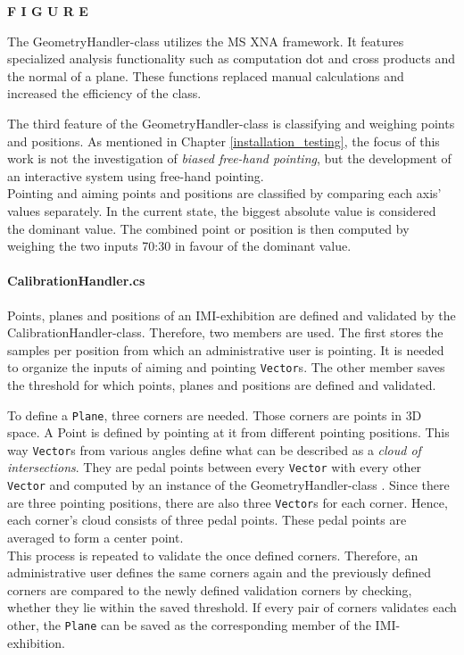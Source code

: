 \textbf{F I G U R E}

The GeometryHandler-class utilizes the \ac{MS} XNA framework. It features specialized analysis functionality such as computation dot and cross products and the normal of a plane. These functions replaced manual calculations and increased the efficiency of the class.

The third feature of the GeometryHandler-class is classifying and weighing points and positions. As mentioned in Chapter \ref{installation_testing}, the focus of this work is not the investigation of \textit{biased free-hand pointing}, but the development of an interactive system using free-hand pointing.
\\
Pointing and aiming points and positions are classified by comparing each axis' values separately. In the current state, the biggest absolute value is considered the dominant value. The combined point or position is then computed by weighing the two inputs 70:30 in favour of the dominant value.


\paragraph{CalibrationHandler.cs} Points, planes and positions of an \ac{IMI}-exhibition are defined and validated by the CalibrationHandler-class. Therefore, two members are used. The first stores the samples per position from which an administrative user is pointing. It is needed to organize the inputs of aiming and pointing \texttt{Vector}s. The other member saves the threshold for which points, planes and positions are defined and validated.

To define a \texttt{Plane}, three corners are needed. Those corners are points in \ac{3D} space. A Point is defined by pointing at it from different pointing positions. This way \texttt{Vector}s from various angles define what can be described as a \textit{cloud of intersections}. They are pedal points between every \texttt{Vector} with every other \texttt{Vector} and computed by an instance of the GeometryHandler-class . Since there are three pointing positions, there are also three \texttt{Vector}s for each corner. Hence, each corner's cloud consists of three pedal points. These pedal points are averaged to form a center point.
\\
This process is repeated to validate the once defined corners. Therefore, an administrative user defines the same corners again and the previously defined corners are compared to the newly defined validation corners by checking, whether they lie within the saved threshold. If every pair of corners validates each other, the \texttt{Plane} can be saved as the corresponding member of the \ac{IMI}-exhibition.

